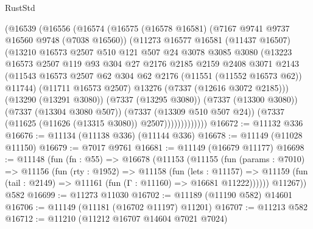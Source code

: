 \begin{lexlean}{RustStd}
\begin{coremodule}
              (@16539
                (@16556
                  (@16574
                    (@16575
                      (@16578 @16581)
                      (@7167 @9741 @9737 @16560 @9748 (@7038 @16560))
                      (@11273
                        @16577
                        @16581
                        (@11437 @16507)
                        (@13210
                          @16573
                          @2507
                          @510
                          @121
                          @507
                          @24
                          @3078
                          @3085
                          @3080
                          (@13223
                            @16573
                            @2507
                            @119
                            @93
                            @304
                            @27
                            @2176
                            @2185
                            @2159
                            @2408
                            @3071
                            @2143
                            (@11543
                              @16573
                              @2507
                              @62
                              @304
                              @62
                              @2176
                              (@11551 (@11552 @16573 @62))
                              @11744)
                            (@11711 @16573 @2507)
                            @13276
                            (@7337 (@12616 @3072 @2185)))
                          (@13290 (@13291 @3080))
                          (@7337 (@13295 @3080))
                          (@7337 (@13300 @3080))
                          (@7337 (@13304 @3080 @507))
                          (@7337 (@13309 @510 @507 @24))
                          (@7337 (@11625 (@11626 (@13315 @3080)) @2507)))))))))))))
@16672 := @11132 @336
@16676 := @11134 (@11138 @336) (@11144 @336)
@16678 := @11149 (@11028 @11150)
@16679 := @7017 @9761
@16681 := @11149 (@16679 @11177)
@16698 := @11148
    (fun (fn : @55) =>
    @16678
      (@11153
        (@11155
          (fun (params : @7010) =>
          @11156
            (fun (rty : @1952) =>
            @11158
              (fun (lets : @11157) =>
              @11159 (fun (tail : @2149) => @11161 (fun (Γ : @11160) => @16681 @11222))))))
        @11267))
    @582
@16699 := @11273 @11030
@16702 := @11189 (@11190 @582) @14601
@16706 := @11149 (@11181 (@16702 @11197) @11201)
@16707 := @11213 @582
@16712 := @11210 (@11212 @16707 @14604 @7021 @7024)

\end{coremodule}
\end{lexlean}
